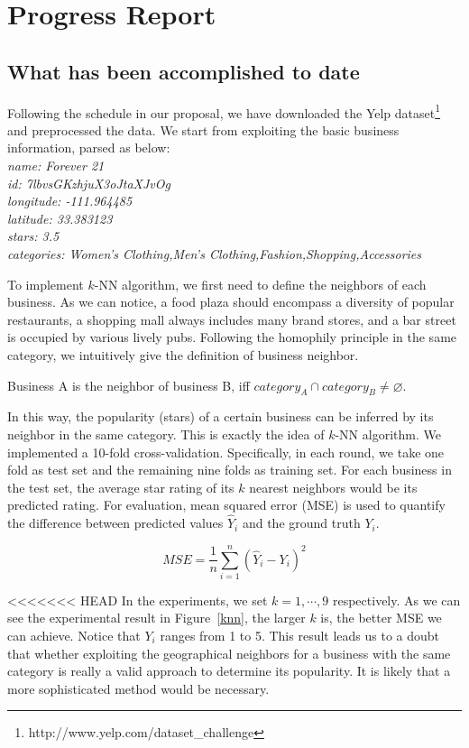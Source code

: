 \section*{Progress Report}
\subsection{What has been accomplished to date}

Following the schedule in our proposal, we have downloaded the Yelp dataset\footnote{http://www.yelp.com/dataset\_challenge} and preprocessed the data. We start from exploiting the basic business information, parsed as below:\\
\emph{
\small
\indent name: Forever 21\\
\indent id: 7lbvsGKzhjuX3oJtaXJvOg\\
\indent longitude: -111.964485\\
\indent latitude: 33.383123\\
\indent stars: 3.5\\
\indent categories: Women's Clothing,Men's Clothing,Fashion,Shopping,Accessories
}

To implement $k$-NN algorithm, we first need to define the neighbors of each business. As we can notice, a food plaza should encompass a diversity of popular restaurants, a shopping mall always includes many brand stores, and a bar street is occupied by various lively pubs. Following the homophily principle in the same category, we intuitively give the definition of business neighbor.

\begin{defn}
Business A is the neighbor of business B, iff $category_A \cap category_B \neq \varnothing$.
\end{defn}

In this way, the popularity (stars) of a certain business can be inferred by its neighbor in the same category. This is exactly the idea of $k$-NN algorithm. We implemented a 10-fold cross-validation. Specifically, in each round, we take one fold as test set and the remaining nine folds as training set. For each business in the test set, the average star rating of its $k$ nearest neighbors would be its predicted rating. For evaluation, mean squared error (MSE) is used to quantify the difference between predicted values $\hat{Y}_i$ and the ground truth $Y_i$.

$$MSE=\frac{1}{n}\sum_{i=1}^{n}(\hat{Y}_i-Y_i)^2$$

<<<<<<< HEAD
In the experiments, we set $k=1,\cdots,9$ respectively. As we can see the experimental result in Figure~\ref{knn}, the larger $k$ is, the better MSE we can achieve. Notice that $Y_i$ ranges from 1 to 5. This result leads us to a doubt that whether exploiting the geographical neighbors for a business with the same category is really a valid approach to determine its popularity. It is likely that a more sophisticated method would be necessary.

